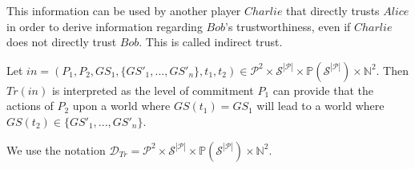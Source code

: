     This information can be used by another player $Charlie$ that directly trusts $Alice$ in order to derive information
    regarding $Bob$'s trustworthiness, even if $Charlie$ does not directly trust $Bob$. This is called indirect trust.

    \begin{definition}[Trust]
      
    \end{definition}
    \noindent Let $in = \left(P_1, P_2, GS_1, \{GS'_1, ...,GS'_n\}, t_1, t_2\right) \in \mathcal{P}^2 \times
    \mathcal{S}^{|\mathcal{P}|} \times \mathbb{P}\left(\mathcal{S}^{|\mathcal{P}|}\right) \times \mathbb{N}^2$. Then
    $Tr\left(in\right)$ is interpreted as the level of commitment $P_1$ can provide that the actions of $P_2$ upon a world where
    $GS\left(t_1\right) = GS_1$ will lead to a world where $GS\left(t_2\right) \in \{GS'_1, ...,GS'_n\}$.

    We use the notation $\mathcal{D}_{Tr} = \mathcal{P}^2 \times \mathcal{S}^{|\mathcal{P}|} \times
    \mathbb{P}\left(\mathcal{S}^{|\mathcal{P}|}\right) \times \mathbb{N}^2$.

